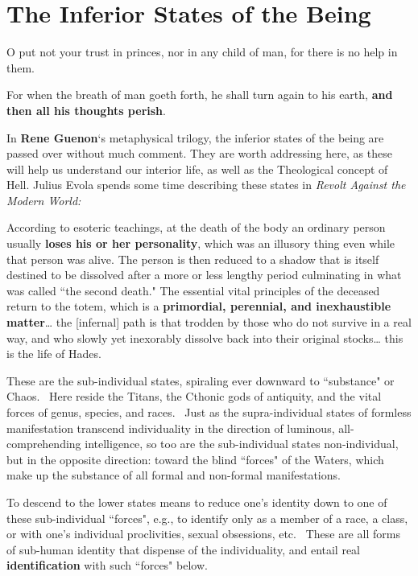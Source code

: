 \section{The Inferior States of the Being}

\begin{quotex}
O put not your trust in princes, nor in any child of man, for there is no help in them.

For when the breath of man goeth forth, he shall turn again to his earth, \textbf{and then all his thoughts perish}. 

\end{quotex}
In \textbf{Rene Guenon}`s metaphysical trilogy, the inferior states of the being are passed over without much comment. They are worth addressing here, as these will help us understand our interior life, as well as the Theological concept of Hell. Julius Evola spends some time describing these states in \emph{Revolt Against the Modern World:}

\begin{quotex}
According to esoteric teachings, at the death of the body an ordinary person usually \textbf{loses his or her personality}, which was an illusory thing even while that person was alive. The person is then reduced to a shadow that is itself destined to be dissolved after a more or less lengthy period culminating in what was called ``the second death." The essential vital principles of the deceased return to the totem, which is a \textbf{primordial, perennial, and inexhaustible matter}… the [infernal] path is that trodden by those who do not survive in a real way, and who slowly yet inexorably dissolve back into their original stocks… this is the life of Hades. 

\end{quotex}
These are the sub-individual states, spiraling ever downward to ``substance" or Chaos.  Here reside the Titans, the Cthonic gods of antiquity, and the vital forces of genus, species, and races.  Just as the supra-individual states of formless manifestation transcend individuality in the direction of luminous, all-comprehending intelligence, so too are the sub-individual states non-individual, but in the opposite direction: toward the blind ``forces" of the Waters, which make up the substance of all formal and non-formal manifestations.

To descend to the lower states means to reduce one's identity down to one of these sub-individual ``forces", e.g., to identify only as a member of a race, a class, or with one's individual proclivities, sexual obsessions, etc.  These are all forms of sub-human identity that dispense of the individuality, and entail real \textbf{identification }with such ``forces" below.

